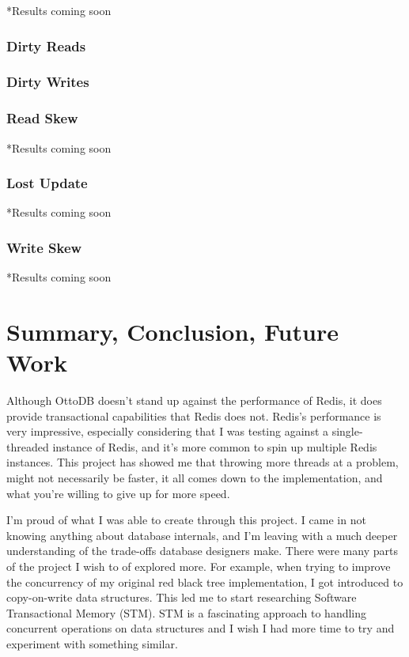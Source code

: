 \documentclass[conference]{IEEEtran}
\begin{document}
    *Results coming soon

    \subsubsection{Dirty Reads}

    \subsubsection{Dirty Writes}

    \subsubsection{Read Skew}

    *Results coming soon

    \subsubsection{Lost Update}

    *Results coming soon

    \subsubsection{Write Skew}

    *Results coming soon


    \section{Summary, Conclusion, Future Work}

    Although OttoDB doesn't stand up against the performance of Redis, it does provide transactional capabilities that Redis does not. Redis's performance is very impressive, especially considering that I was testing against a single-threaded instance of Redis, and it's more common to spin up multiple Redis instances. This project has showed me that throwing more threads at a problem, might not necessarily be faster, it all comes down to the implementation, and what you're willing to give up for more speed. 
    
    I'm proud of what I was able to create through this project. I came in not knowing anything about database internals, and I'm leaving with a much deeper understanding of the trade-offs database designers make. There were many parts of the project I wish to of explored more. For example, when trying to improve the concurrency of my original red black tree implementation, I got introduced to copy-on-write data structures. This led me to start researching Software Transactional Memory (STM). STM is a fascinating approach to handling concurrent operations on data structures and I wish I had more time to try and experiment with something similar.
    
\end{document}
